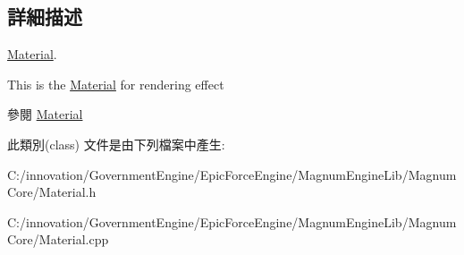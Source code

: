 \subsection{詳細描述}
\hyperlink{class_i_dream_sky_1_1_material}{Material}. 

This is the \hyperlink{class_i_dream_sky_1_1_material}{Material} for rendering effect \begin{DoxySeeAlso}{參閱}
\hyperlink{class_i_dream_sky_1_1_material}{Material} 
\end{DoxySeeAlso}


此類別(class) 文件是由下列檔案中產生\+:\begin{DoxyCompactItemize}
\item 
C\+:/innovation/\+Government\+Engine/\+Epic\+Force\+Engine/\+Magnum\+Engine\+Lib/\+Magnum\+Core/Material.\+h\item 
C\+:/innovation/\+Government\+Engine/\+Epic\+Force\+Engine/\+Magnum\+Engine\+Lib/\+Magnum\+Core/Material.\+cpp\end{DoxyCompactItemize}
